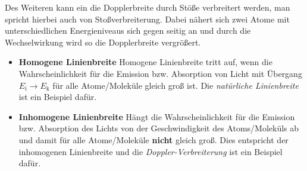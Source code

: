 Des Weiteren kann ein die Dopplerbreite durch Stöße verbreitert werden, man spricht hierbei auch von Stoßverbreiterung. Dabei nähert sich zwei Atome mit unterschiedlichen Energieniveaus sich gegen seitig an und durch die Wechselwirkung wird so die Dopplerbreite vergrößert. \cite{DemtroederAtome}
\begin{itemize}
    \item \textbf{Homogene Linienbreite}
    Homogene Linienbreite tritt auf, wenn die Wahrscheinlichkeit für die Emission bzw. Absorption von Licht mit Übergang $E_\mathrm{i} \rightarrow E_\mathrm{k}$ für alle Atome/Moleküle gleich groß ist. Die \textit{natürliche Linienbreite} ist ein Beispiel dafür. \cite{DemtroederLaser1}
    \item \textbf{Inhomogene Linienbreite}
    Hängt die Wahrscheinlichkeit für die Emission bzw. Absorption des Lichts von der Geschwindigkeit des Atoms/Moleküls ab und damit für alle Atome/Moleküle \textbf{nicht} gleich groß. Dies entspricht der inhomogenen Linienbreite und die \textit{Doppler-Verbreiterung} ist ein Beispiel dafür. \cite{DemtroederLaser1}
\end{itemize}